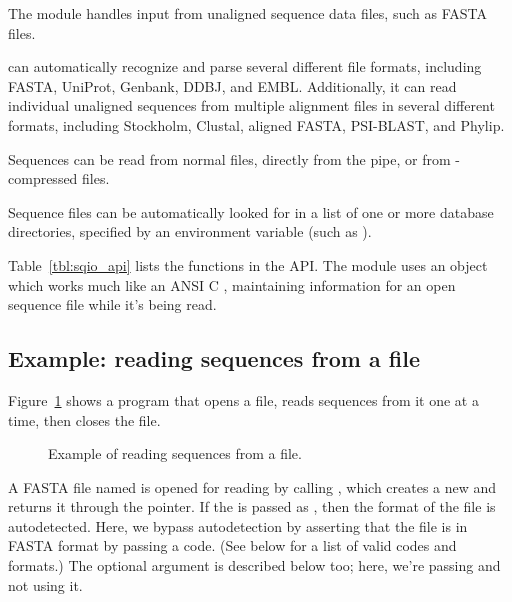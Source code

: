 The  module handles input from unaligned sequence data
files, such as FASTA files.

 can automatically recognize and parse several different
file formats, including FASTA, UniProt, Genbank, DDBJ, and EMBL.
Additionally, it can read individual unaligned sequences from multiple
alignment files in several different formats, including Stockholm,
Clustal, aligned FASTA, PSI-BLAST, and Phylip.

Sequences can be read from normal files, directly from the
 pipe, or from -compressed files.

Sequence files can be automatically looked for in a list of one or
more database directories, specified by an environment variable (such
as ).

Table~\ref{tbl:sqio_api} lists the functions in the  API.
The module uses an  object which works much like an
ANSI C , maintaining information for an open sequence file
while it's being read.

%




\subsection{Example: reading sequences from a file}

Figure~\ref{fig:sqio_example_text} shows a program that opens a file, reads
sequences from it one at a time, then closes the file.

\begin{figure}

\caption{Example of reading sequences from a file.}
\label{fig:sqio_example_text}
\end{figure}

A FASTA file named  is opened for reading by calling
, which
creates a new  and returns it through the
 pointer. If the  is passed as
, then the format of the file is
autodetected. Here, we bypass autodetection by asserting that the file
is in FASTA format by passing a  code. (See
below for a list of valid codes and formats.) The optional 
argument is described below too; here, we're passing  and
not using it.

